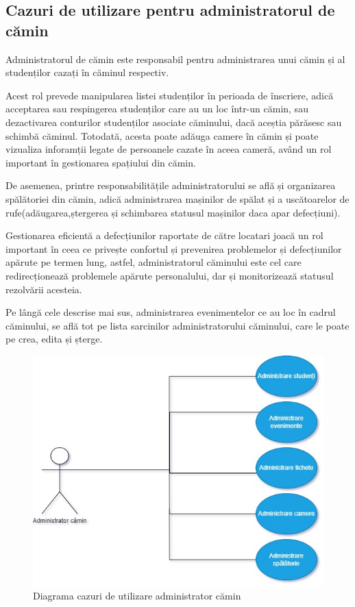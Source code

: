 \documentclass[12pt,a4paper]{report}
\theoremstyle{definition}
\theoremstyle{remark}
\begin{document}
\subsection{Cazuri de utilizare pentru administratorul de cămin}
\par Administratorul de cămin este responsabil pentru administrarea unui cămin și al studenților cazați în căminul respectiv.

\par Acest rol prevede manipularea listei studenților în perioada de înscriere, adică acceptarea sau respingerea studenților care au un loc într-un cămin, sau dezactivarea conturilor studenților asociate căminului, dacă aceștia părăsesc sau schimbă căminul. Totodată, acesta poate adăuga camere în cămin și poate vizualiza inforamții legate de persoanele cazate în aceea cameră, având un rol important în gestionarea spațiului din cămin.
\par De asemenea, printre responsabilitățile administratorului se află și organizarea spălătoriei din cămin, adică administrarea mașinilor de spălat și a uscătoarelor de rufe(adăugarea,ștergerea și schimbarea statusul mașinilor daca apar defecțiuni). 
\par Gestionarea eficientă a defecțiunilor raportate de către locatari joacă un rol important în ceea ce privește confortul și prevenirea problemelor și defecțiunilor apărute pe termen lung, astfel, administratorul căminului este cel care redirecționează problemele apărute personalului, dar și monitorizează statusul rezolvării acesteia.
\par Pe lângă cele descrise mai sus, administrarea evenimentelor ce au loc în cadrul căminului, se află tot pe lista sarcinilor administratorului căminului, care le poate pe crea, edita și șterge.

\begin{figure}[H]
    \centering
    \includegraphics[width=0.6\linewidth, height=0.3\textheight]{resurse/diagrame/UVTDorms_USECASE_ADMINISTRATOR_CAMIN.jpg}
    \caption{Diagrama cazuri de utilizare administrator cămin}
\end{figure}
\end{document}

